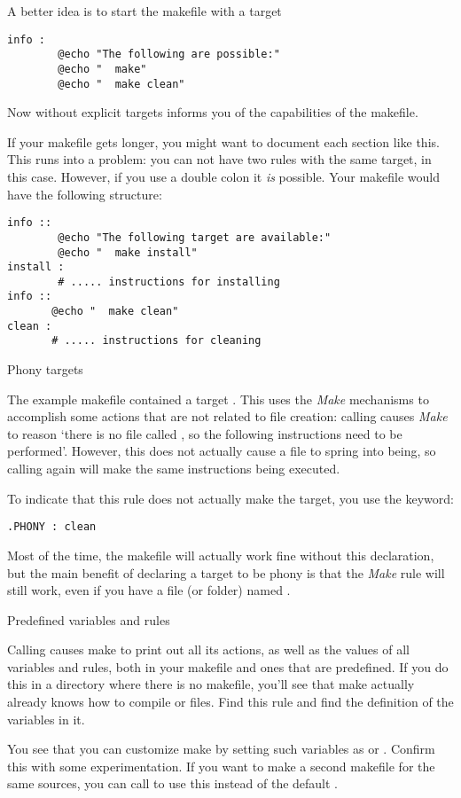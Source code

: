 A better idea is to start the makefile with a target
\begin{verbatim}
info :
        @echo "The following are possible:"
        @echo "  make"
        @echo "  make clean"
\end{verbatim}
Now  without explicit targets informs you of the capabilities
of the makefile.

If your makefile gets longer, you might want to document each section
like this. This runs into a problem: you can not have two rules with the same
target,  in this case. However, if you use a double colon
it \emph{is} possible. Your makefile would have the following structure:
\begin{verbatim}
info ::
        @echo "The following target are available:"
        @echo "  make install"
install :
        # ..... instructions for installing
info ::
       @echo "  make clean"
clean :
       # ..... instructions for cleaning
\end{verbatim}
 {Phony targets}

The example makefile contained a target . This uses
the \emph{Make} mechanisms to accomplish some actions that are not
related to file creation: calling  causes \emph{Make} to
reason `there is no file called , so the following
instructions need to be performed'. However, this does not actually
cause a file  to spring into being, so calling 
again will make the same instructions being executed.

To indicate that this rule does not actually make the target, you use
the  keyword:
\begin{verbatim}
.PHONY : clean
\end{verbatim}
Most of the time, the makefile will actually work fine without this
declaration, but the main benefit of declaring a target to be phony is
that the \emph{Make} rule will still work, even if you have a file (or folder)
named .

 {Predefined variables and rules}

Calling  causes make to print out all its
actions, as well as the values of all variables and rules, both in
your makefile and ones that are predefined. If you do this in a
directory where there is no makefile, you'll see that make actually
already knows how to compile  or  files. Find this rule
and find the definition of the variables in it.

You see that you can customize make by setting such variables as
 or . Confirm this with some experimentation. If
you want to make a second makefile for the same sources, you can call
 to use this instead of the default
.

